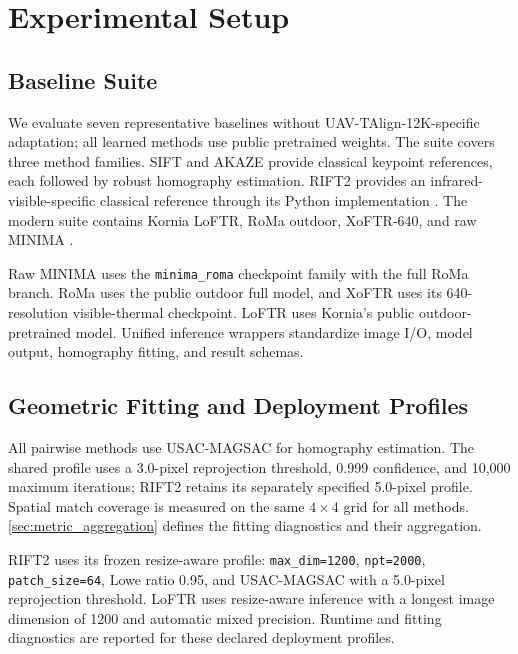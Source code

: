 
\section{Experimental Setup}

\subsection{Baseline Suite}

We evaluate seven representative baselines without UAV-TAlign-12K-specific adaptation; all learned
methods use public pretrained weights. The suite covers three method families. SIFT and AKAZE provide
classical keypoint references, each followed by robust homography estimation. RIFT2 provides an
infrared-visible-specific classical reference through its Python implementation
\cite{li2023rift2,yagmur_rift2_python}. The modern suite
contains Kornia LoFTR, RoMa outdoor, XoFTR-640, and raw MINIMA
\cite{sun2021loftr,edstedt2024roma,tuzcuoglu2024xoftr,ren2025minima}.

Raw MINIMA uses the \texttt{minima\_roma} checkpoint family with the full RoMa branch. RoMa uses
the public outdoor full model, and XoFTR uses its 640-resolution visible-thermal checkpoint. LoFTR
uses Kornia's public outdoor-pretrained model. Unified inference wrappers standardize image I/O,
model output, homography fitting, and result schemas.

\subsection{Geometric Fitting and Deployment Profiles}

All pairwise methods use USAC-MAGSAC for homography estimation. The shared profile uses a
3.0-pixel reprojection threshold, 0.999 confidence, and 10,000 maximum iterations;
RIFT2 retains its separately specified 5.0-pixel profile. Spatial match coverage is measured on
the same $4\!\times\!4$ grid for all methods. \ref{sec:metric_aggregation} defines the
fitting diagnostics and their aggregation.

RIFT2 uses its frozen resize-aware profile: \texttt{max\_dim=1200}, \texttt{npt=2000},
\texttt{patch\_size=64}, Lowe ratio 0.95, and USAC-MAGSAC with a 5.0-pixel reprojection threshold.
LoFTR uses resize-aware inference with a longest image dimension of 1200 and automatic mixed
precision. Runtime and fitting diagnostics are reported for these declared deployment profiles.

